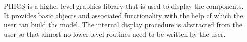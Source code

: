     PHIGS is a higher level graphics library that is used to display the 
	components. It provides basic objects and
    associated functionality with the help of which the user can build the 
	model.
    The internal display procedure is abstracted from the user so that
    almost no lower level routines need to be written by the user.

